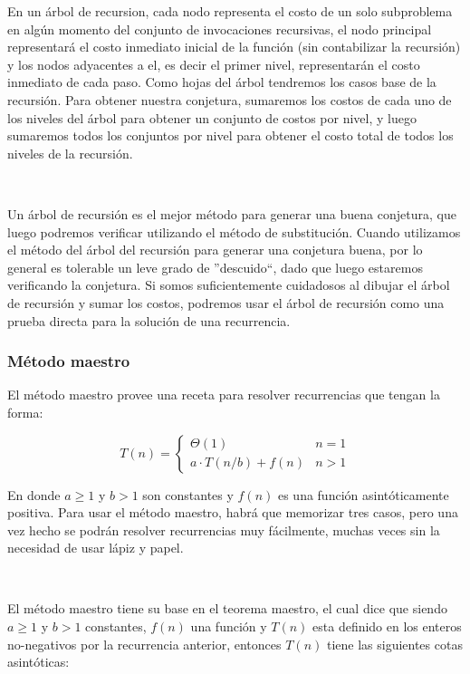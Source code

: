 En un \'arbol de recursion, cada nodo representa el costo de un solo subproblema en alg\'un momento del conjunto de invocaciones recursivas, el nodo principal representar\'a el costo inmediato inicial de la funci\'on (sin contabilizar la recursi\'on) y los nodos adyacentes a el, es decir el primer nivel, representar\'an el costo inmediato de cada paso. Como hojas del \'arbol tendremos los casos base de la recursi\'on. Para obtener nuestra conjetura, sumaremos los costos de cada uno de los niveles del \'arbol para obtener un conjunto de costos por nivel, y luego sumaremos todos los conjuntos por nivel para obtener el costo total de todos los niveles de la recursi\'on.

~

Un \'arbol de recursi\'on es el mejor m\'etodo para generar una buena conjetura, que luego podremos verificar utilizando el m\'etodo de substituci\'on. Cuando utilizamos el m\'etodo del \'arbol del recursi\'on para generar una conjetura buena, por lo general es tolerable un leve grado de ''descuido``, dado que luego estaremos verificando la conjetura. Si somos suficientemente cuidadosos al dibujar el \'arbol de recursi\'on y sumar los costos, podremos usar el \'arbol de recursi\'on como una prueba directa para la soluci\'on de una recurrencia.

\subsubsection{M\'etodo maestro}

El m\'etodo maestro provee una receta para resolver recurrencias que tengan la forma:

\begin{equation*}
  T(n) = \begin{cases}
	      \Theta(1)         		& n=1 \\
	      a \cdot T(n/b) + f(n)        	& n > 1
	  \end{cases}
\end{equation*}

En donde $a \geq 1$ y $b>1$ son constantes y $f(n)$ es una funci\'on asint\'oticamente positiva. Para usar el m\'etodo maestro, habr\'a que memorizar tres casos, pero una vez hecho se podr\'an resolver recurrencias muy f\'acilmente, muchas veces sin la necesidad de usar l\'apiz y papel.

~

El m\'etodo maestro tiene su base en el teorema maestro, el cual dice que siendo $a\geq 1$ y $b>1$ constantes, $f(n)$ una funci\'on y $T(n)$ esta definido en los enteros no-negativos por la recurrencia anterior, entonces $T(n)$ tiene las siguientes cotas asint\'oticas:

